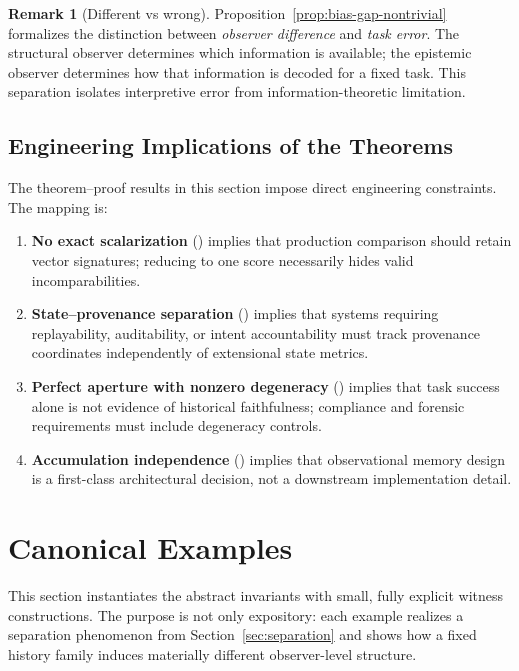\documentclass[11pt,twoside]{article}
\theoremstyle{definition}
\newtheorem{remark}[theorem]{Remark}
\begin{document}
\begin{remark}[Different vs wrong]
\label{rem:different-vs-wrong}
Proposition~\ref{prop:bias-gap-nontrivial} formalizes the distinction between \emph{observer difference} and \emph{task error}. The structural observer determines which information is available; the epistemic observer determines how that information is decoded for a fixed task. This separation isolates interpretive error from information-theoretic limitation.
\end{remark}

\subsection{Engineering Implications of the Theorems}
\label{subsec:theorem-proof-engineering}

The theorem--proof results in this section impose direct engineering constraints. The mapping is:
\begin{enumerate}[leftmargin=*]
  \item \textbf{No exact scalarization} () implies that production comparison should retain vector signatures; reducing to one score necessarily hides valid incomparabilities.
  \item \textbf{State--provenance separation} () implies that systems requiring replayability, auditability, or intent accountability must track provenance coordinates independently of extensional state metrics.
  \item \textbf{Perfect aperture with nonzero degeneracy} () implies that task success alone is not evidence of historical faithfulness; compliance and forensic requirements must include degeneracy controls.
  \item \textbf{Accumulation independence} () implies that observational memory design is a first-class architectural decision, not a downstream implementation detail.
\end{enumerate}

\section{Canonical Examples}
\label{sec:examples}

This section instantiates the abstract invariants with small, fully explicit witness constructions. The purpose is not only expository: each example realizes a separation phenomenon from Section~\ref{sec:separation} and shows how a fixed history family induces materially different observer-level structure.
\end{document}
